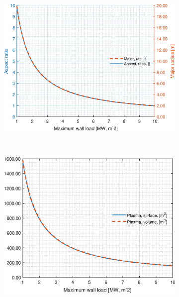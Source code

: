 \begin{figure}[H]
	\begin{subfigure}[b]{.45\textwidth}
		\includegraphics[width=\textwidth]{MatlabFigures/PW/f3.eps}
	\end{subfigure}
	~
	\begin{subfigure}[b]{.45\textwidth}
		\includegraphics[width=\textwidth]{MatlabFigures/PW/f4.eps}
	\end{subfigure}


\end{figure}
